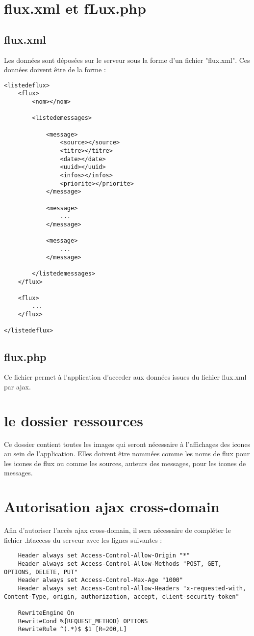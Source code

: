 \documentclass{report}
\begin{document}
\section{flux.xml et fLux.php}

\subsection{flux.xml}
Les données sont déposées sur le serveur sous la forme d'un fichier "flux.xml". Ces données doivent être de la forme :

\begin{verbatim}
<listedeflux>
	<flux>
		<nom></nom>
		
		<listedemessages>
		
			<message>
				<source></source>
				<titre></titre>
				<date></date>
				<uuid></uuid>
				<infos></infos>
				<priorite></priorite>
			</message>
			
			<message>
				...
			</message>

			<message>
				...
			</message>

		</listedemessages>
	</flux>

	<flux>
		...
	</flux>

</listedeflux>
\end{verbatim}

\subsection{flux.php}
Ce fichier permet à l'application d'acceder aux données issues du fichier flux.xml par ajax.

\section{le dossier ressources}
Ce dossier contient toutes les images qui seront nécessaire à l'affichages des icones au sein de l'application. Elles doivent être nommées comme les noms de flux pour les icones de flux ou comme les sources, auteurs des messages, pour les icones de messages.

\section{Autorisation ajax cross-domain}
Afin d'autoriser l'accès ajax cross-domain, il sera nécessaire de compléter le fichier .htaccess du serveur avec les lignes suivantes :

\begin{verbatim}
	Header always set Access-Control-Allow-Origin "*"
	Header always set Access-Control-Allow-Methods "POST, GET, OPTIONS, DELETE, PUT"
	Header always set Access-Control-Max-Age "1000"
	Header always set Access-Control-Allow-Headers "x-requested-with, Content-Type, origin, authorization, accept, client-security-token"
	 
	RewriteEngine On
	RewriteCond %{REQUEST_METHOD} OPTIONS
	RewriteRule ^(.*)$ $1 [R=200,L]
\end{verbatim}
\end{document}
